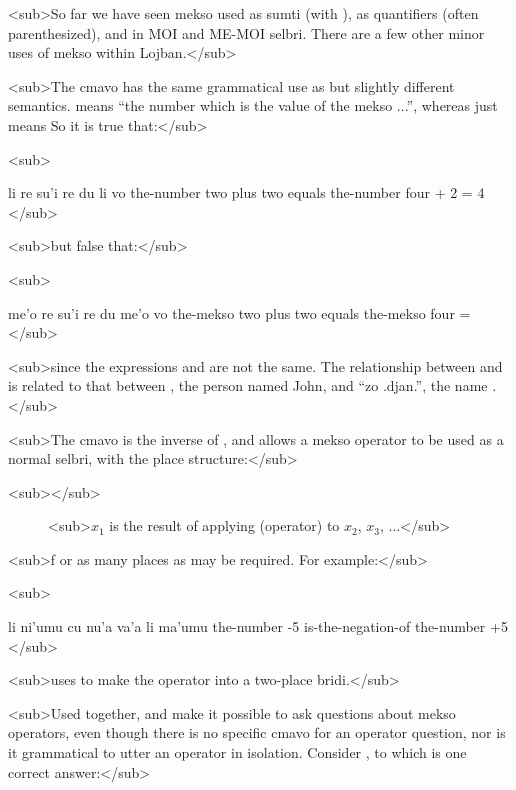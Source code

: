 <sub>So far we have seen mekso used as sumti (with ),
    as quantifiers (often parenthesized), and in MOI and ME-MOI
    selbri. There are a few other minor uses of mekso within
    Lojban.</sub>

<sub>The cmavo  has the same grammatical use as
     but slightly different semantics.  means ``the
    number which is the value of the mekso ...'', whereas 
    just means  So it is true that:</sub>

<sub>
\begin{example}
li re su'i re du li vo\n
the-number two plus two equals the-number four + 2 = 4
</sub>
\end{example}

<sub>but false that:</sub>

<sub>
\begin{example}
me'o re su'i re du me'o vo\n
the-mekso two plus two equals the-mekso four\n
{} = 
</sub>
\end{example}

<sub>since the expressions  and  are not the
    same. The relationship between  and  is related
    to that between , the person named John, and ``zo
    .djan.'', the name .</sub>

<sub>The cmavo  is the inverse of , and
    allows a mekso operator to be used as a normal selbri, with the
    place structure:</sub>
\begin{description}
\item[<sub></sub>] <sub>$x_1$ is the result of applying (operator) to $x_2$, $x_3$, ...</sub>
\end{description}

<sub>f or as many places as may be required. For example:</sub>

<sub>
\begin{example}
li ni'umu cu nu'a va'a li ma'umu\n
the-number -5 is-the-negation-of the-number +5
</sub>
\end{example}

<sub>uses  to make the operator  into a
    two-place bridi.</sub>

<sub>Used together,  and  make it possible
    to ask questions about mekso operators, even though there is no
    specific cmavo for an operator question, nor is it grammatical
    to utter an operator in isolation. Consider , to which  is one correct answer:</sub>

